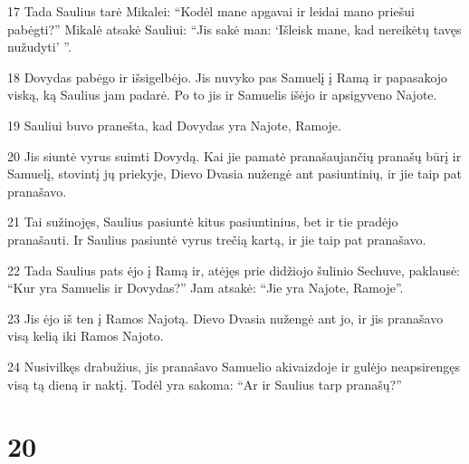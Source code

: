 \par 17 Tada Saulius tarė Mikalei: “Kodėl mane apgavai ir leidai mano priešui pabėgti?” Mikalė atsakė Sauliui: “Jis sakė man: ‘Išleisk mane, kad nereikėtų tavęs nužudyti’ ”. 
\par 18 Dovydas pabėgo ir išsigelbėjo. Jis nuvyko pas Samuelį į Ramą ir papasakojo viską, ką Saulius jam padarė. Po to jis ir Samuelis išėjo ir apsigyveno Najote. 
\par 19 Sauliui buvo pranešta, kad Dovydas yra Najote, Ramoje. 
\par 20 Jis siuntė vyrus suimti Dovydą. Kai jie pamatė pranašaujančių pranašų būrį ir Samuelį, stovintį jų priekyje, Dievo Dvasia nužengė ant pasiuntinių, ir jie taip pat pranašavo. 
\par 21 Tai sužinojęs, Saulius pasiuntė kitus pasiuntinius, bet ir tie pradėjo pranašauti. Ir Saulius pasiuntė vyrus trečią kartą, ir jie taip pat pranašavo. 
\par 22 Tada Saulius pats ėjo į Ramą ir, atėjęs prie didžiojo šulinio Sechuve, paklausė: “Kur yra Samuelis ir Dovydas?” Jam atsakė: “Jie yra Najote, Ramoje”. 
\par 23 Jis ėjo iš ten į Ramos Najotą. Dievo Dvasia nužengė ant jo, ir jis pranašavo visą kelią iki Ramos Najoto. 
\par 24 Nusivilkęs drabužius, jis pranašavo Samuelio akivaizdoje ir gulėjo neapsirengęs visą tą dieną ir naktį. Todėl yra sakoma: “Ar ir Saulius tarp pranašų?”



\chapter{20}

